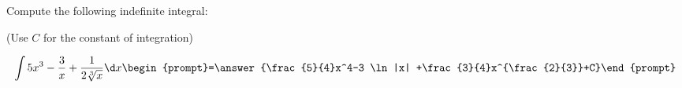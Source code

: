 \documentclass{ximera}
\author{Jim Talamo}
\begin{document}
\begin{exercise}
Compute the following indefinite integral: 

\begin{prompt} (Use $C$ for the constant of integration) \end{prompt}

\[
\int 5x^3-\frac{3}{x}+\frac{1}{2 \sqrt[3]{x}}  \d x 
\begin{prompt}=\answer{\frac{5}{4}x^4-3 \ln |x| +\frac{3}{4}x^{\frac{2}{3}}+C}\end{prompt}
\]

\end{exercise}
\end{document}
